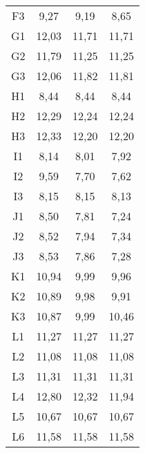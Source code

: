 \begin{center}
\begin{longtable}{cccc}
    F3    & 9,27  & 9,19  & 8,65 \\
    G1    & 12,03 & 11,71 & 11,71 \\
    G2    & 11,79 & 11,25 & 11,25 \\
    G3    & 12,06 & 11,82 & 11,81 \\
    H1    & 8,44  & 8,44  & 8,44 \\
    H2    & 12,29 & 12,24 & 12,24 \\
    H3    & 12,33 & 12,20 & 12,20 \\
    I1    & 8,14  & 8,01  & 7,92 \\
    I2    & 9,59  & 7,70  & 7,62 \\
    I3    & 8,15  & 8,15  & 8,13 \\
    J1    & 8,50  & 7,81  & 7,24 \\
    J2    & 8,52  & 7,94  & 7,34 \\
    J3    & 8,53  & 7,86  & 7,28 \\
    K1    & 10,94 & 9,99  & 9,96 \\
    K2    & 10,89 & 9,98  & 9,91 \\
    K3    & 10,87 & 9,99  & 10,46 \\
    L1    & 11,27 & 11,27 & 11,27 \\
    L2    & 11,08 & 11,08 & 11,08 \\
    L3    & 11,31 & 11,31 & 11,31 \\
    L4    & 12,80 & 12,32 & 11,94 \\
    L5    & 10,67 & 10,67 & 10,67 \\
    L6    & 11,58 & 11,58 & 11,58 \\

\end{longtable}
\end{center}

